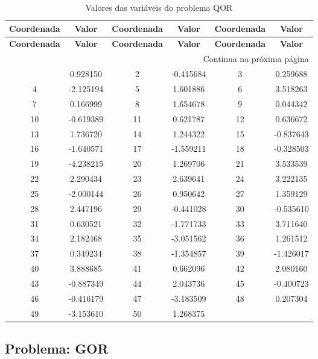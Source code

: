 \documentclass[12pt]{article}
\begin{document}
\small
\begin{longtable}{@{}cc|cc|cc@{}}
\caption{Valores das variáveis do problema QOR} \\
\toprule
\textbf{Coordenada} & \textbf{Valor} & \textbf{Coordenada} & \textbf{Valor} & \textbf{Coordenada} & \textbf{Valor} \\
\midrule
\endfirsthead

\toprule
\textbf{Coordenada} & \textbf{Valor} & \textbf{Coordenada} & \textbf{Valor} & \textbf{Coordenada} & \textbf{Valor} \\
\midrule
\endhead

\midrule \multicolumn{6}{r}{{Continua na próxima página}} \\ \midrule
\endfoot

\bottomrule
\endlastfoot
1 & 0.928150 & 2 & -0.415684 & 3 & 0.259688 \\
4 & -2.125194 & 5 & 1.601886 & 6 & 3.518263 \\
7 & 0.166999 & 8 & 1.654678 & 9 & 0.044342 \\
10 & -0.619389 & 11 & 0.621787 & 12 & 0.636672 \\
13 & 1.736720 & 14 & 1.244322 & 15 & -0.837643 \\
16 & -1.640571 & 17 & -1.559211 & 18 & -0.328503 \\
19 & -4.238215 & 20 & 1.269706 & 21 & 3.533539 \\
22 & 2.290434 & 23 & 2.639641 & 24 & 3.222135 \\
25 & -2.000144 & 26 & 0.950642 & 27 & 1.359129 \\
28 & 2.447196 & 29 & -0.441028 & 30 & -0.535610 \\
31 & 0.630521 & 32 & -1.771733 & 33 & 3.711640 \\
34 & 2.182468 & 35 & -3.051562 & 36 & 1.261512 \\
37 & 0.349234 & 38 & -1.354857 & 39 & -1.426017 \\
40 & 3.888685 & 41 & 0.662096 & 42 & 2.080160 \\
43 & -0.887349 & 44 & 2.043736 & 45 & -0.400723 \\
46 & -0.416179 & 47 & -3.183509 & 48 & 0.207304 \\
49 & -3.153610 & 50 & 1.268375 &  &  \\

\end{longtable}


\newpage            
\subsection{Problema: GOR}
\end{document}
